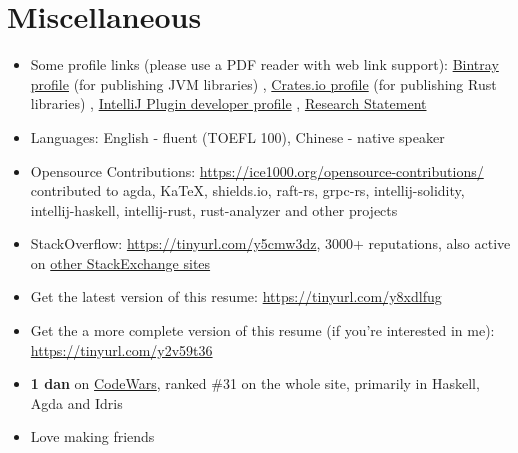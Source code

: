 \documentclass{resume}
\begin{document}
\section{Miscellaneous}
\begin{itemize}[parsep=0.25ex]
  \item Some profile links (please use a PDF reader with web link support):
    \href{https://bintray.com/ice1000}{Bintray profile} (for publishing JVM libraries)
  , \href{https://crates.io/users/ice1000}{Crates.io profile} (for publishing Rust libraries)
  , \href{https://plugins.jetbrains.com/author/10a216dd-c558-4aaf-aa8a-723f431452fb}
    {IntelliJ Plugin developer profile}
  , \href{https://personal.psu.edu/yqz5714/}{Research Statement}
  \item Languages: English - fluent (TOEFL 100), Chinese - native speaker
  \item Opensource Contributions: \url{https://ice1000.org/opensource-contributions/}
    contributed to \textsf{agda, KaTeX, shields.io, raft-rs, grpc-rs, intellij-solidity, intellij-haskell,
    intellij-rust, rust-analyzer}
    and other projects
  \item StackOverflow: \url{https://tinyurl.com/y5cmw3dz},
    3000+ reputations, also active on \href{https://stackexchange.com/users/9532102/} {other StackExchange sites}
  \item Get the latest version of this resume: \url{https://tinyurl.com/y8xdlfug}
  \item Get the a more complete version of this resume (if you're interested in me):
    \url{https://tinyurl.com/y2v59t36}
  \item \textbf{1 dan} on
    \href{https://www.codewars.com/users/ice1000} {CodeWars},
    ranked \#31 on the whole site, primarily in Haskell, Agda and Idris
  \item Love making friends
\end{itemize}

%
%
\end{document}
